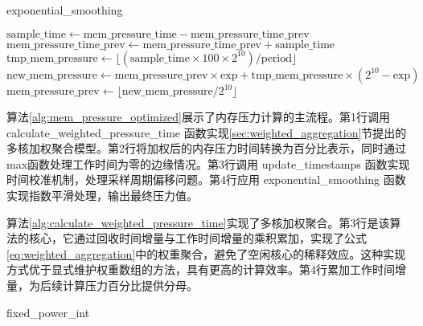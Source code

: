  \begin{algorithm}[htb]
     \caption{exponential\_smoothing}
     \label{alg:exponential_smoothing}
     \SetAlgoLined
     \DontPrintSemicolon
     
     \(\text{sample\_time}\gets \text{mem\_pressure\_time}-\text{mem\_pressure\_time\_prev}\)\;
     \(\text{mem\_pressure\_time\_prev} \gets \text{mem\_pressure\_time\_prev} + \text{sample\_time}\)\;
     \(\text{tmp\_mem\_pressure}\gets \lfloor(\text{sample\_time}\times 100\times 2^{10})/\text{period}\rfloor\)\;
     \(\text{new\_mem\_pressure}\gets \text{mem\_pressure\_prev}\times \text{exp} + \text{tmp\_mem\_pressure}\times(2^{10}-\text{exp})\)\;
     \(\text{mem\_pressure\_prev}\gets \lfloor \text{new\_mem\_pressure}/2^{10}\rfloor\)\;
 \end{algorithm}
算法\ref{alg:mem_pressure_optimized}展示了内存压力计算的主流程。第1行调用\\
 calculate\_weighted\_pressure\_time 函数实现\ref{sec:weighted_aggregation}节提出的多核加权聚合模型。第2行将加权后的内存压力时间转换为百分比表示，同时通过max函数处理工作时间为零的边缘情况。第3行调用 update\_timestamps 函数实现时间校准机制，处理采样周期偏移问题。第4行应用 exponential\_smoothing 函数实现指数平滑处理，输出最终压力值。

算法\ref{alg:calculate_weighted_pressure_time}实现了多核加权聚合。第3行是该算法的核心，它通过回收时间增量与工作时间增量的乘积累加，实现了公式\ref{eq:weighted_aggregation}中的权重聚合，避免了空闲核心的稀释效应。这种实现方式优于显式维护权重数组的方法，具有更高的计算效率。第4行累加工作时间增量，为后续计算压力百分比提供分母。
\begin{algorithm}[htb]
    \caption{fixed\_power\_int}
    \label{alg:helper_functions}

\end{algorithm}

